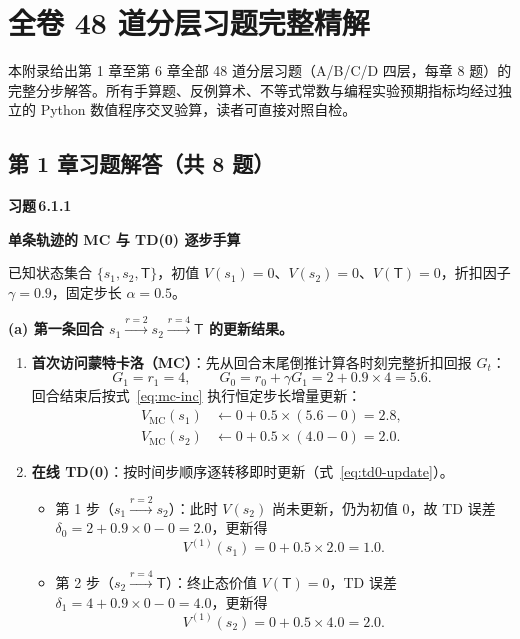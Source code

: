\renewcommand{\chaptermark}[1]{\markboth{附录 \thechapter\quad #1}{}}
\newcommand{\solItem}[2]{%
  \par\vspace{4.5mm}\noindent
  \colorbox{tealLight}{\strut\;\sffamily\bfseries\footnotesize\color{tealDark}习题\,#1\;}\;%
  {\normalsize\sffamily\bfseries\color{ink}#2}\par\nopagebreak\vspace{1.2mm}%
}

\chapter[全卷 48 道分层习题完整精解]{全卷 48 道分层习题完整精解}
\label{app:solutions}


本附录给出第 1 章至第 6 章全部 48 道分层习题（A/B/C/D 四层，每章 8 题）的完整分步解答。所有手算题、反例算术、不等式常数与编程实验预期指标均经过独立的 Python 数值程序交叉验算，读者可直接对照自检。

\section*{第 1 章习题解答（共 8 题）}

\solItem{6.1.1}{单条轨迹的 MC 与 TD(0) 逐步手算}

已知状态集合 $\{s_1, s_2, \mathsf{T}\}$，初值 $V(s_1) = 0$、$V(s_2) = 0$、$V(\mathsf{T}) = 0$，折扣因子 $\gamma = 0.9$，固定步长 $\alpha = 0.5$。

\textbf{(a) 第一条回合 $s_1 \xrightarrow{r=2} s_2 \xrightarrow{r=4} \mathsf{T}$ 的更新结果。}
\begin{enumerate}
  \item \textbf{首次访问蒙特卡洛（MC）}：先从回合末尾倒推计算各时刻完整折扣回报 $G_t$：
  \[
    G_1 = r_1 = 4, \qquad
    G_0 = r_0 + \gamma G_1 = 2 + 0.9 \times 4 = 5.6.
  \]
  回合结束后按式~\eqref{eq:mc-inc} 执行恒定步长增量更新：
  \begin{align*}
    V_{\mathrm{MC}}(s_1) &\leftarrow 0 + 0.5 \times (5.6 - 0) = \mathbf{2.8}, \\
    V_{\mathrm{MC}}(s_2) &\leftarrow 0 + 0.5 \times (4.0 - 0) = \mathbf{2.0}.
  \end{align*}
  \item \textbf{在线 TD(0)}：按时间步顺序逐转移即时更新（式~\eqref{eq:td0-update}）。
  \begin{itemize}
    \item 第 1 步（$s_1 \xrightarrow{r=2} s_2$）：此时 $V(s_2)$ 尚未更新，仍为初值 $0$，故 TD 误差 $\delta_0 = 2 + 0.9 \times 0 - 0 = 2.0$，更新得
    \[
      V^{(1)}(s_1) = 0 + 0.5 \times 2.0 = \mathbf{1.0}.
    \]
    \item 第 2 步（$s_2 \xrightarrow{r=4} \mathsf{T}$）：终止态价值 $V(\mathsf{T}) = 0$，TD 误差 $\delta_1 = 4 + 0.9 \times 0 - 0 = 4.0$，更新得
    \[
      V^{(1)}(s_2) = 0 + 0.5 \times 4.0 = \mathbf{2.0}.
    \]
  \end{itemize}
\end{enumerate}

